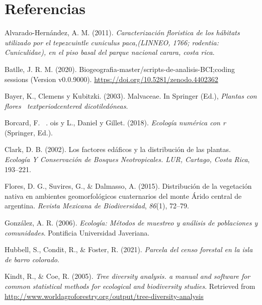 \documentclass[11pt,]{article}
\newenvironment{Shaded}{\begin{snugshade}}{\end{snugshade}}
\newcommand{\NormalTok}[1]{#1}
\begin{document}
\begin{Shaded}
\begin{Highlighting}[]
{{{{{{{{{{{{{{{\NormalTok{\textbackslash{}ldots}
\end{Highlighting}
\end{Shaded}

\section*{Referencias}\label{referencias}

\hypertarget{refs}{}
\hypertarget{ref-alvarado2011caracterizacion}{}
Alvarado-Hernández, A. M. (2011). \emph{Caracterización floristica de
los hábitats utilizado por el tepezcuintle cuniculus paca,(LINNEO, 1766;
rodentia: Cuniculidae), en el piso basal del parque nacional carara,
costa rica}.

\hypertarget{ref-jose_ramon_martinez_batlle_2020_4402362}{}
Batlle, J. R. M. (2020).
Biogeografia-master/scripts-de-analisis-BCI;coding sessions (Version
v0.0.9000). \url{https://doi.org/10.5281/zenodo.4402362}

\hypertarget{ref-bayer2003malvaceae}{}
Bayer, K., Clemens y Kubitzki. (2003). Malvaceae. In Springer (Ed.),
\emph{Plantas con flores ~textperiodcentered dicotiledóneas}.

\hypertarget{ref-borcard2018ecologia}{}
Borcard, F. ~. ois y L., Daniel y Gillet. (2018). \emph{Ecología
numérica con r} (Springer, Ed.).

\hypertarget{ref-clark2002factores}{}
Clark, D. B. (2002). Los factores edáficos y la distribución de las
plantas. \emph{Ecología Y Conservación de Bosques Neotropicales. LUR,
Cartago, Costa Rica}, 193--221.

\hypertarget{ref-flores2015distribucion}{}
Flores, D. G., Suvires, G., \& Dalmasso, A. (2015). Distribución de la
vegetación nativa en ambientes geomorfológicos cuaternarios del monte
Árido central de argentina. \emph{Revista Mexicana de Biodiversidad},
\emph{86}(1), 72--79.

\hypertarget{ref-gonzalez2006ecologia}{}
González, A. R. (2006). \emph{Ecología: Métodos de muestreo y análisis
de poblaciones y comunidades}. Pontificia Universidad Javeriana.

\hypertarget{ref-webcenso}{}
Hubbell, S., Condit, R., \& Foster, R. (2021). \emph{Parcela del censo
forestal en la isla de barro colorado}.

\hypertarget{ref-biodiversidad}{}
Kindt, R., \& Coe, R. (2005). \emph{Tree diversity analysis. a manual
and software for common statistical methods for ecological and
biodiversity studies}. Retrieved from
\url{http://www.worldagroforestry.org/output/tree-diversity-analysis}
\end{document}
